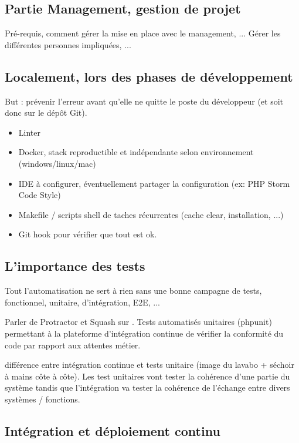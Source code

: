 
\subsection{Partie Management, gestion de projet}

Pré-requis, comment gérer la mise en place avec le management, ... Gérer les différentes personnes impliquées, ...

\subsection{Localement, lors des phases de développement}

But : prévenir l'erreur avant qu'elle ne quitte le poste du développeur (et soit donc sur le dépôt Git).

 \begin{itemize}
 	\item Linter
 	\item Docker, stack reproductible et indépendante selon environnement (windows/linux/mac) 
 	\item IDE à configurer, éventuellement partager la configuration (ex: PHP Storm Code Style)
 	\item Makefile / scripts shell de taches récurrentes (cache clear, installation, ...)
 	\item Git hook pour vérifier que tout est ok.
 \end{itemize}

\subsection{L'importance des tests}

Tout l'automatisation ne sert à rien sans une bonne campagne de tests, fonctionnel, unitaire, d'intégration, E2E, ...

Parler de Protractor et Squash sur \bv. Tests automatisés unitaires (phpunit) permettant à la plateforme d'intégration continue de vérifier la conformité du code par rapport aux attentes métier.

différence entre intégration continue et tests unitaire (image du lavabo + séchoir à mains côte à côte). Les test unitaires vont tester la cohérence d'une partie du système tandis que l'intégration va tester la cohérence de l'échange entre divers systèmes / fonctions.

\subsection{Intégration et déploiement continu}


